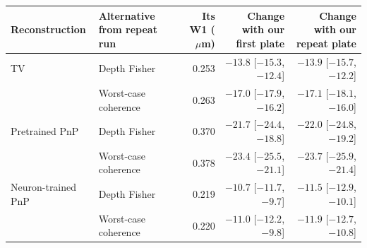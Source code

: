 \begin{tabular}{@{}llrrr@{}}
\toprule
Reconstruction & Alternative from repeat run & Its W1 ($\mu$m) & Change with our first plate & Change with our repeat plate \\
\midrule
TV & Depth Fisher & 0.253 & $-13.8$ [$-15.3$, $-12.4$] & $-13.9$ [$-15.7$, $-12.2$] \\
 & Worst-case coherence & 0.263 & $-17.0$ [$-17.9$, $-16.2$] & $-17.1$ [$-18.1$, $-16.0$] \\
\addlinespace[2pt]
Pretrained PnP & Depth Fisher & 0.370 & $-21.7$ [$-24.4$, $-18.8$] & $-22.0$ [$-24.8$, $-19.2$] \\
 & Worst-case coherence & 0.378 & $-23.4$ [$-25.5$, $-21.1$] & $-23.7$ [$-25.9$, $-21.4$] \\
\addlinespace[2pt]
Neuron-trained PnP & Depth Fisher & 0.219 & $-10.7$ [$-11.7$, $-9.7$] & $-11.5$ [$-12.9$, $-10.1$] \\
 & Worst-case coherence & 0.220 & $-11.0$ [$-12.2$, $-9.8$] & $-11.9$ [$-12.7$, $-10.8$] \\
\bottomrule
\end{tabular}
